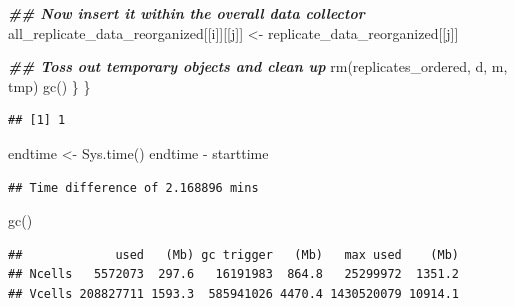 \documentclass[
]{book}
\newenvironment{Shaded}{\begin{snugshade}}{\end{snugshade}}
\newcommand{\CommentTok}[1]{\textcolor[rgb]{0.56,0.35,0.01}{\textit{#1}}}
\newcommand{\ControlFlowTok}[1]{\textcolor[rgb]{0.13,0.29,0.53}{\textbf{#1}}}
\newcommand{\DecValTok}[1]{\textcolor[rgb]{0.00,0.00,0.81}{#1}}
\newcommand{\DocumentationTok}[1]{\textcolor[rgb]{0.56,0.35,0.01}{\textbf{\textit{#1}}}}
\newcommand{\FunctionTok}[1]{\textcolor[rgb]{0.00,0.00,0.00}{#1}}
\newcommand{\NormalTok}[1]{#1}
\newcommand{\OtherTok}[1]{\textcolor[rgb]{0.56,0.35,0.01}{#1}}
\newcommand{\SpecialCharTok}[1]{\textcolor[rgb]{0.00,0.00,0.00}{#1}}
\begin{document}
\begin{Shaded}
\begin{Highlighting}[]
    \DocumentationTok{\#\# Now insert it within the overall data collector}
\NormalTok{    all\_replicate\_data\_reorganized[[i]][[j]] }\OtherTok{\textless{}{-}}
\NormalTok{      replicate\_data\_reorganized[[j]]}

    \DocumentationTok{\#\# Toss out temporary objects and clean up}
    \FunctionTok{rm}\NormalTok{(replicates\_ordered, d, m, tmp)}
    \FunctionTok{gc}\NormalTok{()}
\NormalTok{  \}}
\NormalTok{\}}
\end{Highlighting}
\end{Shaded}

\begin{verbatim}
## [1] 1
\end{verbatim}

\begin{Shaded}
\begin{Highlighting}[]
\NormalTok{endtime }\OtherTok{\textless{}{-}} \FunctionTok{Sys.time}\NormalTok{()}
\NormalTok{endtime }\SpecialCharTok{{-}}\NormalTok{ starttime}
\end{Highlighting}
\end{Shaded}

\begin{verbatim}
## Time difference of 2.168896 mins
\end{verbatim}

\begin{Shaded}
\begin{Highlighting}[]
\FunctionTok{gc}\NormalTok{()}
\end{Highlighting}
\end{Shaded}

\begin{verbatim}
##             used   (Mb) gc trigger   (Mb)   max used    (Mb)
## Ncells   5572073  297.6   16191983  864.8   25299972  1351.2
## Vcells 208827711 1593.3  585941026 4470.4 1430520079 10914.1
\end{verbatim}

\begin{Shaded}
\end{Shaded}
\end{document}

